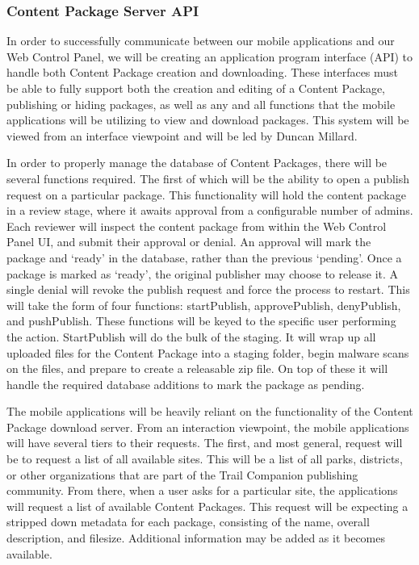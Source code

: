 \documentclass[letterpaper, 10pt,titlepage]{article}
\begin{document}
\subsubsection{Content Package Server API}
In order to successfully communicate between our mobile applications and our Web Control Panel, we will be creating an application program interface (API) to handle both Content Package creation and downloading. These interfaces must be able to fully support both the creation and editing of a Content Package, publishing or hiding packages, as well as any and all functions that the mobile applications will be utilizing to view and download packages. This system will be viewed from an interface viewpoint and will be led by Duncan Millard.

In order to properly manage the database of Content Packages, there will be several functions required. The first of which will be the ability to open a publish request on a particular package. This functionality will hold the content package in a review stage, where it awaits approval from a configurable number of admins. Each reviewer will inspect the content package from within the Web Control Panel UI, and submit their approval or denial. An approval will mark the package and ‘ready’ in the database, rather than the previous ‘pending’. Once a package is marked as ‘ready’, the original publisher may choose to release it. A single denial will revoke the publish request and force the process to restart. This will take the form of four functions: startPublish, approvePublish, denyPublish, and pushPublish. These functions will be keyed to the specific user performing the action. StartPublish will do the bulk of the staging. It will wrap up all uploaded files for the Content Package into a staging folder, begin malware scans on the files, and prepare to create a releasable zip file. On top of these it will handle the required database additions to mark the package as pending.

The mobile applications will be heavily reliant on the functionality of the Content Package download server. From an interaction viewpoint, the mobile applications will have several tiers to their requests. The first, and most general, request will be to request a list of all available sites. This will be a list of all parks, districts, or other organizations that are part of the Trail Companion publishing community. From there, when a user asks for a particular site, the applications will request a list of available Content Packages. This request will be expecting a stripped down metadata for each package, consisting of the name, overall description, and filesize. Additional information may be added as it becomes available.
\end{document}
